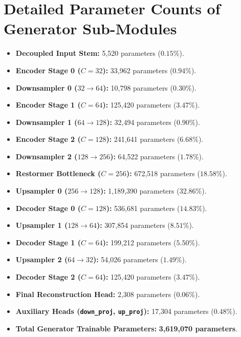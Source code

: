 \section{Detailed Parameter Counts of Generator Sub-Modules}
\begin{itemize}
    \item \textbf{Decoupled Input Stem:} 5,520 parameters ($0.15\%$).
    \item \textbf{Encoder Stage 0 ($C=32$):} 33,962 parameters ($0.94\%$).
    \item \textbf{Downsampler 0 ($32 \to 64$):} 10,798 parameters ($0.30\%$).
    \item \textbf{Encoder Stage 1 ($C=64$):} 125,420 parameters ($3.47\%$).
    \item \textbf{Downsampler 1 ($64 \to 128$):} 32,494 parameters ($0.90\%$).
    \item \textbf{Encoder Stage 2 ($C=128$):} 241,641 parameters ($6.68\%$).
    \item \textbf{Downsampler 2 ($128 \to 256$):} 64,522 parameters ($1.78\%$).
    \item \textbf{Restormer Bottleneck ($C=256$):} 672,518 parameters ($18.58\%$).
    \item \textbf{Upsampler 0 ($256 \to 128$):} 1,189,390 parameters ($32.86\%$).
    \item \textbf{Decoder Stage 0 ($C=128$):} 536,681 parameters ($14.83\%$).
    \item \textbf{Upsampler 1 ($128 \to 64$):} 307,854 parameters ($8.51\%$).
    \item \textbf{Decoder Stage 1 ($C=64$):} 199,212 parameters ($5.50\%$).
    \item \textbf{Upsampler 2 ($64 \to 32$):} 54,026 parameters ($1.49\%$).
    \item \textbf{Decoder Stage 2 ($C=64$):} 125,420 parameters ($3.47\%$).
    \item \textbf{Final Reconstruction Head:} 2,308 parameters ($0.06\%$).
    \item \textbf{Auxiliary Heads (\texttt{down\_proj}, \texttt{up\_proj}):} 17,304 parameters ($0.48\%$).
    \item \textbf{Total Generator Trainable Parameters:} \textbf{3,619,070 parameters}.
\end{itemize}
